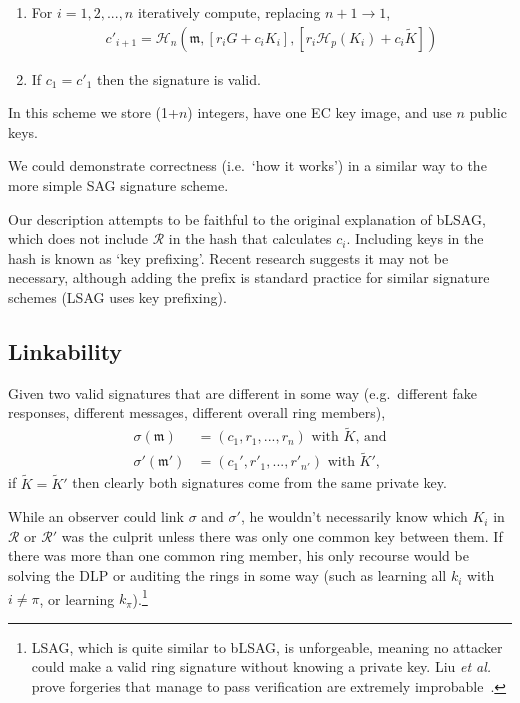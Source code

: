 \begin{enumerate}
	\item For \(i = 1, 2, ..., n\) iteratively compute, replacing \(n + 1 \rightarrow 1\),\vspace{.175cm}
	\begin{align*}
	c'_{i+1} = \mathcal{H}_n(\mathfrak{m}, [r_i G + c_i {K_i}], [r_i \mathcal{H}_p(K_i) + c_i \tilde{K}])
	\end{align*}

	\item If \(c_1 = c'_1\) then the signature is valid.
\end{enumerate}

In this scheme we store (1+$n$) integers, have one EC key image, and use $n$ public keys.

We could demonstrate correctness (i.e.\ `how it works') in a similar way to the more simple SAG signature scheme.

Our description attempts to be faithful to the original explanation of bLSAG, which does not include $\mathcal{R}$ in the hash that calculates $c_i$. Including keys in the hash is known as `key prefixing'. Recent research \cite{key-prefix-paper} suggests it may not be necessary, although adding the prefix is standard practice for similar signature schemes (LSAG uses key prefixing).


\subsection*{Linkability}

Given two valid signatures that are different in some way (e.g.\ different fake responses, different messages, different overall ring members),\vspace{.07cm}
\begin{align*}
	\sigma(\mathfrak{m})   &= (c_1, r_1, ..., r_n)\textrm{ with } \tilde{K}\textrm{, and}\\
	\sigma'(\mathfrak{m}')  &= (c_1', r'_1, ..., r'_{n'})\textrm{ with } \tilde{K}'\textrm{,}
\end{align*}
\quad if \(\tilde{K} =  \tilde{K}'\) then clearly both signatures come from the same private key.%

While an observer could link $\sigma$ and $\sigma'$, he wouldn't necessarily know which $K_i$ in $\mathcal{R}$ or $\mathcal{R}'$ was the culprit unless there was only one common key between them. If there was more than one common ring member, his only recourse would be solving the DLP or auditing the rings in some way (such as learning all $k_i$ with $i \neq \pi$, or learning $k_\pi$).\footnote{\label{lsag_unforgeable_note}LSAG, which is quite similar to bLSAG, is unforgeable, meaning no attacker could make a valid ring signature without knowing a private key. Liu {\em et al.} prove forgeries that manage to pass verification are extremely improbable~\cite{Liu2004}.}



